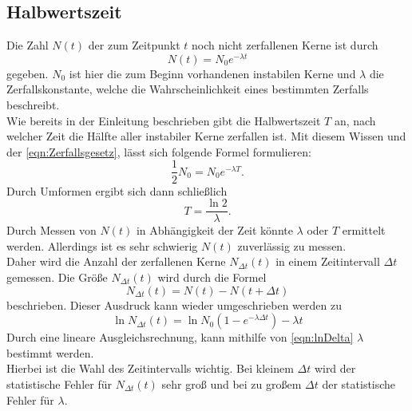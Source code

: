 \subsection{Halbwertszeit}
Die Zahl $N(t)$ der zum Zeitpunkt $t$ noch nicht zerfallenen Kerne ist durch
\begin{equation}
    \label{eqn:Zerfallsgesetz}
    N(t) = N_0 e^{- \lambda t}
\end{equation}
gegeben. $N_0$ ist hier die zum Beginn vorhandenen instabilen Kerne und $\lambda$ die Zerfallskonstante, welche die Wahrscheinlichkeit
eines bestimmten Zerfalls beschreibt.\\
Wie bereits in der Einleitung beschrieben gibt die Halbwertszeit $T$ an, nach welcher Zeit die Hälfte aller instabiler Kerne
zerfallen ist. Mit diesem Wissen und der \autoref{eqn:Zerfallsgesetz}, lässt sich folgende Formel formulieren:
\begin{equation*}
    \frac{1}{2}N_0 = N_0 e^{- \lambda T}.
\end{equation*}
Durch Umformen ergibt sich dann schließlich
\begin{equation}
    \label{eqn:T}
    T = \frac{\ln{2}}{\lambda} .
\end{equation}
Durch Messen von $N(t)$ in Abhängigkeit der Zeit könnte $\lambda$ oder $T$ ermittelt werden. Allerdings ist es sehr schwierig $N(t)$ zuverlässig 
zu messen.\\
Daher wird die Anzahl der zerfallenen Kerne $N_{\Delta t}(t)$ in einem Zeitintervall $\Delta t$ gemessen. Die Größe $N_{\Delta t}(t)$ wird
durch die Formel
\begin{equation*}
    N_{\Delta t}(t) = N(t) - N(t + \Delta t)
\end{equation*}
beschrieben.
Dieser Ausdruck kann wieder umgeschrieben werden zu
\begin{equation}
    \label{eqn:lnDelta}
    \ln{N_{\Delta t}(t)} = \ln{N_0 (1-e^{- \lambda \Delta t})} - \lambda t
\end{equation}
Durch eine lineare Ausgleichsrechnung, kann mithilfe von \autoref{eqn:lnDelta} $\lambda$ bestimmt werden.\\
Hierbei ist die Wahl des Zeitintervalls wichtig. Bei kleinem $\Delta t$ wird der statistische Fehler für $N_{\Delta t}(t)$
sehr groß und bei zu großem $\Delta t$ der statistische Fehler für $\lambda$.